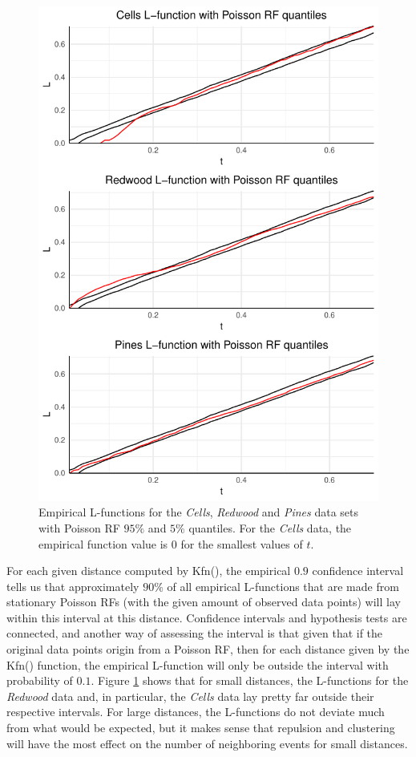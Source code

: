 \begin{figure}
    \centering
    \includegraphics[scale=0.9]{figures/prob1_quantiles.pdf}
    \caption{Empirical L-functions for the \textit{Cells}, \textit{Redwood} and \textit{Pines} data sets with Poisson RF $95\%$ and $5\%$ quantiles. For the \textit{Cells} data, the empirical function value is $0$ for the smallest values of $t$.}
    \label{fig:poiss_quantiles}
\end{figure}

For each given distance computed by Kfn(), the empirical $0.9$ confidence interval tells us that approximately $90\%$ of all empirical L-functions that are made from stationary Poisson RFs (with the given amount of observed data points) will lay within this interval at this distance. Confidence intervals and hypothesis tests are connected, and another way of assessing the interval is that given that if the original data points origin from a Poisson RF, then for each distance given by the Kfn() function, the empirical L-function will only be outside the interval with probability of $0.1$. Figure \ref{fig:poiss_quantiles} shows that for small distances, the L-functions for the \textit{Redwood} data and, in particular, the \textit{Cells} data lay pretty far outside their respective intervals. For large distances, the L-functions do not deviate much from what would be expected, but it makes sense that repulsion and clustering will have the most effect on the number of neighboring events for small distances.

